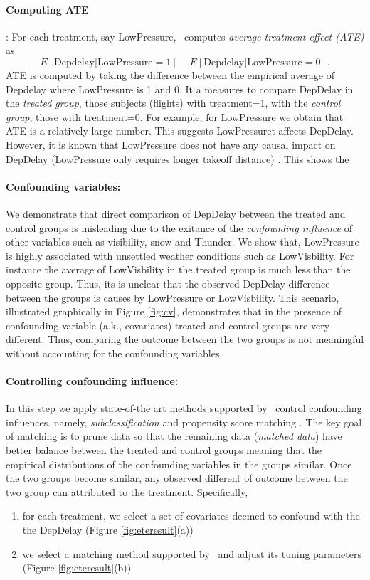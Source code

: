  \paragraph{ \bf Computing ATE}: For each treatment, say LowPressure, \GSQL\ computes {\em average treatment effect (ATE)} as $$E[\text{Depdelay}|\text{LowPressure}=1] - E[\text{Depdelay}|\text{LowPressure}=0].$$
 ATE is computed by taking the difference between the empirical average of Depdelay where LowPressure is 1 and 0. It a measures to compare DepDelay in the {\em treated group}, those subjects (flights) with treatment=1, with the {\em control group}, those with treatment=0.
 For example, for LowPressure we obtain that ATE is a relatively large number. This suggests  LowPressuret affects DepDelay. However, it is known that
  LowPressure does not have any causal impact on DepDelay (LowPressure only requires longer takeoff distance) \cite{FAA08}.  This shows the

 \paragraph{\bf Confounding variables:} We demonstrate that direct comparison of DepDelay between the treated and control groups is misleading due to the exitance of the  {\em  confounding influence} of other variables such as visibility, snow and Thunder.  We show that, LowPressure is highly associated with unsettled weather conditions such as LowVisbility. For instance the average of LowVisbility in the treated group is much less than
  the opposite group. Thus, its is unclear that the observed DepDelay difference between the groups is causes by LowPressure or LowVisbility. This scenario, illustrated graphically in Figure \ref{fig:cv}, demonstrates that in the presence of confounding variable (a.k., covariates) treated and control groups are very different. Thus, comparing the outcome between the two groups is not meaningful without accounting for the confounding variables.


 \paragraph{\bf Controlling confounding influence:}
In this step we apply state-of-the art methods supported by \GSQL\ control confounding influences. 
namely,  {\em subclassification} and {propensity score matching} \cite{Rubin1983b,IacKinPor09,rosenbaum1984reducing}.
The key goal of matching is to prune data so that
the remaining data ({\em matched data}) have better balance between the treated and control groups meaning that the empirical distributions of the confounding variables in the groups  similar. Once the two groups become similar, any observed different of outcome between the two group can attributed to the treatment. Specifically,
     \begin{enumerate}
      \item for each treatment, we select a set of covariates deemed to confound with the the DepDelay (Figure \ref{fig:eteresult}(a))
      \item we select a matching method supported by \GSQL\ and adjust its tuning parameters (Figure \ref{fig:eteresult}(b))
\end{enumerate}

